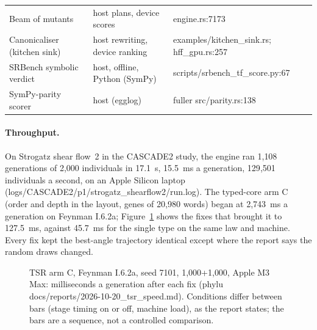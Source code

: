 \documentclass[sigconf,nonacm]{acmart}
\newcommand{\src}[1]{{\small\ttfamily #1}}
\begin{document}
\begin{table}[t]
\begin{tabular}{@{}llp{}@{}}
Beam of mutants & host plans, device scores & \src{engine.\allowbreak{}rs:7173} \\
Canonicaliser (kitchen sink) & host rewriting, device ranking & \src{examples/\allowbreak{}kitchen\_\allowbreak{}sink.\allowbreak{}rs}; \src{hff\_\allowbreak{}gpu.\allowbreak{}rs:257} \\
SRBench symbolic verdict & host, offline, Python (SymPy) & \src{scripts/\allowbreak{}srbench\_\allowbreak{}tf\_\allowbreak{}score.\allowbreak{}py:67} \\
SymPy-parity scorer & host (egglog) & fuller \src{src/\allowbreak{}parity.\allowbreak{}rs:138} \\
\bottomrule
\end{tabular}
\end{table}

\paragraph{Throughput.} On Strogatz shear flow~2 in the CASCADE2 study, the
engine ran 1{,}108 generations of 2{,}000 individuals in 17.1~s, 15.5~ms a
generation, 129{,}501 individuals a second, on an Apple Silicon laptop
(\src{logs/\allowbreak{}CASCADE2/\allowbreak{}p1/\allowbreak{}strogatz\_\allowbreak{}shearflow2/\allowbreak{}run.\allowbreak{}log}). The typed-core arm C
(order and depth in the layout, genes of 20{,}980 words) began at 2{,}743~ms a
generation on Feynman I.6.2a; Figure~\ref{fig:speed} shows the fixes that
brought it to 127.5~ms, against 45.7~ms for the single type on the same law and
machine. Every fix kept the best-angle trajectory identical except where the
report says the random draws changed.

\begin{figure}[t]
\centering
{}
\caption{TSR arm C, Feynman I.6.2a, seed 7101, 1{,}000+1{,}000, Apple M3 Max:
milliseconds a generation after each fix (\src{phylu
docs/\allowbreak{}reports/\allowbreak{}2026-10-20\_\allowbreak{}tsr\_\allowbreak{}speed.\allowbreak{}md}). Conditions differ between bars (stage
timing on or off, machine load), as the report states; the bars are a sequence,
not a controlled comparison.}
\label{fig:speed}
\end{figure}
\end{document}
